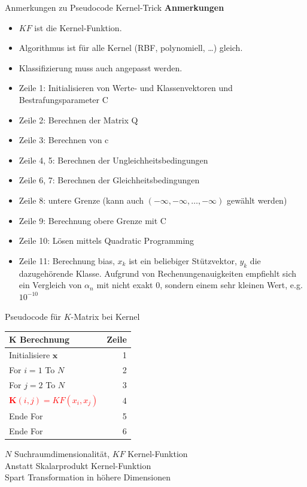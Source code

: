 \documentclass[ngerman]{beamer}
\begin{document}
\begin{frame}{Anmerkungen zu Pseudocode Kernel-Trick}
    \textbf{Anmerkungen} \\
    \begin{itemize}
        \item $KF$ ist die Kernel-Funktion.
        \item Algorithmus ist für alle Kernel (RBF, polynomiell, \ldots) gleich.
        \item Klassifizierung muss auch angepasst werden.
        \item Zeile 1: Initialisieren von Werte- und Klassenvektoren und Bestrafungsparameter C
        \item Zeile 2: Berechnen der Matrix Q
        \item Zeile 3: Berechnen von c
        \item Zeile 4, 5: Berechnen der Ungleichheitsbedingungen
        \item Zeile 6, 7: Berechnen der Gleichheitsbedingungen
        \item Zeile 8: untere Grenze (kann auch $\left( -\infty, -\infty, \ldots, -\infty \right)$ gewählt werden)
        \item Zeile 9: Berechnung obere Grenze mit C
        \item Zeile 10: Lösen mittels Quadratic Programming
        \item Zeile 11: Berechnung bias, $x_{k}$ ist ein beliebiger Stützvektor, $y_{k}$ die dazugehörende Klasse. Aufgrund von Rechenungenauigkeiten empfiehlt sich ein Vergleich von $\alpha_{n}$ mit nicht exakt $0$, sondern einem sehr kleinen Wert, e.g. $10^{-10}$
    \end{itemize}
\end{frame}

\begin{frame}{Pseudocode für $K$-Matrix bei Kernel}
    \begin{tabular}{|l r|}
        \hline
        $\mathbf{K}$ \textbf{Berechnung} & \textbf{Zeile} \\
        \hline
        Initialisiere $\mathbf{x}$ & 1 \\
        For $i=1$ To $N$ & 2 \\
        \quad For $j=2$ To $N$ & 3 \\
        \textcolor{red}{\quad\quad $\mathbf{K}\left( i, j \right) = KF\left( x_{i}, x_{j} \right)$} & 4 \\
        \quad Ende For & 5 \\
        Ende For & 6 \\
        \hline
    \end{tabular} \pause
    $N$ Suchraumdimensionalität, $KF$ Kernel-Funktion \\
    Anstatt Skalarprodukt Kernel-Funktion \\
    Spart Transformation in höhere Dimensionen
\end{frame}
\end{document}
